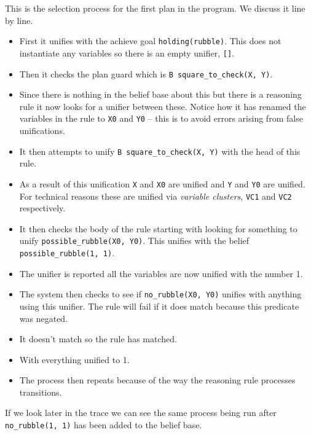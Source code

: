 \documentclass[a4]{article}
\begin{document}
This is the selection process for the first plan in the program.  We discuss it line by line.
\begin{itemize}
\item First it unifies with the achieve goal \texttt{holding(rubble)}.  This does not instantiate any variables so there is an empty unifier, \texttt{[]}.  
\item Then it checks the plan guard which is \lstinline{B square_to_check(X, Y)}.  
\item Since there is nothing in the belief base about this but there is a reasoning rule it now looks for a  unifier between these.  Notice how it has renamed the variables in the rule to \texttt{X0} and \texttt{Y0} -- this is to avoid errors arising from false unifications.  
\item It then attempts to unify \lstinline{B square_to_check(X, Y)} with the head of this rule.
\item As a result of this unification \texttt{X} and \texttt{X0} are unified and \texttt{Y} and \texttt{Y0} are unified.  For technical reasons these are unified via \emph{variable clusters}, \texttt{VC1} and \texttt{VC2} respectively.
\item It then checks the body of the rule starting with looking for something to unify \texttt{possible\_rubble(X0, Y0)}.  This unifies with the belief \texttt{possible\_rubble(1, 1)}.
\item The unifier is reported all the variables are now unified with the number 1.
\item The system then checks to see if \texttt{no\_rubble(X0, Y0)} unifies with anything using this unifier.  The rule will fail if it does match because this predicate was negated.
\item It doesn't match so the rule has matched.
\item With everything unified to 1.
\item The process then repeats because of the way the reasoning rule processes transitions.
\end{itemize}

If we look later in the trace we can see the same process being run after \texttt{no\_rubble(1, 1)} has been added to the belief base.
\end{document}
